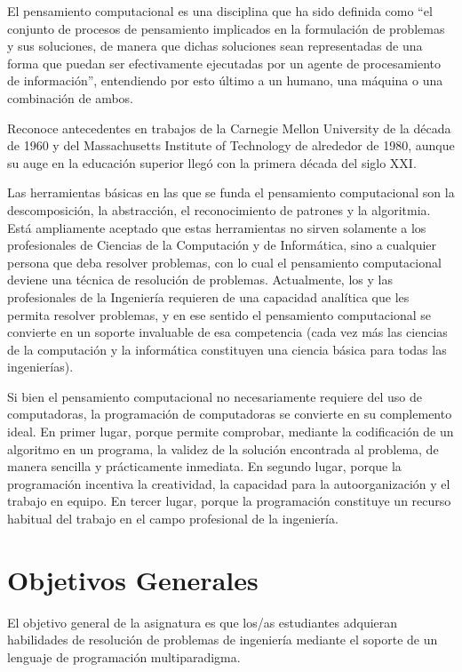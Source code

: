\documentclass[
  letterpaper,
  DIV=11,
  numbers=noendperiod]{scrreprt}
\begin{document}
El pensamiento computacional es una disciplina que ha sido definida como
``el conjunto de procesos de pensamiento implicados en la formulación de
problemas y sus soluciones, de manera que dichas soluciones sean
representadas de una forma que puedan ser efectivamente ejecutadas por
un agente de procesamiento de información'', entendiendo por esto último
a un humano, una máquina o una combinación de ambos.

Reconoce antecedentes en trabajos de la Carnegie Mellon University de la
década de 1960 y del Massachusetts Institute of Technology de alrededor
de 1980, aunque su auge en la educación superior llegó con la primera
década del siglo XXI.

Las herramientas básicas en las que se funda el pensamiento
computacional son la descomposición, la abstracción, el reconocimiento
de patrones y la algoritmia. Está ampliamente aceptado que estas
herramientas no sirven solamente a los profesionales de Ciencias de la
Computación y de Informática, sino a cualquier persona que deba resolver
problemas, con lo cual el pensamiento computacional deviene una técnica
de resolución de problemas. Actualmente, los y las profesionales de la
Ingeniería requieren de una capacidad analítica que les permita resolver
problemas, y en ese sentido el pensamiento computacional se convierte en
un soporte invaluable de esa competencia (cada vez más las ciencias de
la computación y la informática constituyen una ciencia básica para
todas las ingenierías).

Si bien el pensamiento computacional no necesariamente requiere del uso
de computadoras, la programación de computadoras se convierte en su
complemento ideal. En primer lugar, porque permite comprobar, mediante
la codificación de un algoritmo en un programa, la validez de la
solución encontrada al problema, de manera sencilla y prácticamente
inmediata. En segundo lugar, porque la programación incentiva la
creatividad, la capacidad para la autoorganización y el trabajo en
equipo. En tercer lugar, porque la programación constituye un recurso
habitual del trabajo en el campo profesional de la ingeniería.

\section*{Objetivos Generales}\label{objetivos-generales}


El objetivo general de la asignatura es que los/as estudiantes adquieran
habilidades de resolución de problemas de ingeniería mediante el soporte
de un lenguaje de programación multiparadigma.
\end{document}
